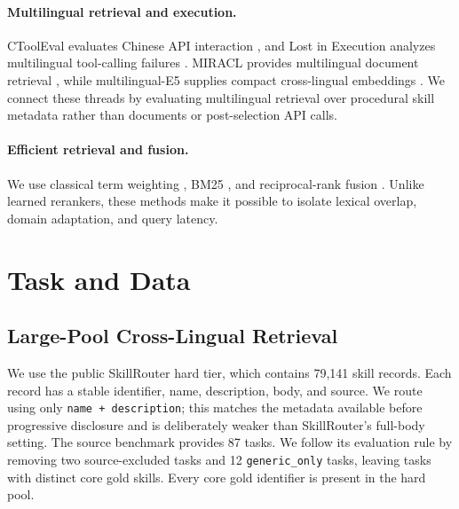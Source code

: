 \documentclass[letterpaper]{article}
\begin{document}
\paragraph{Multilingual retrieval and execution.}
CToolEval evaluates Chinese API interaction \cite{guo2024ctooleval}, and
Lost in Execution analyzes multilingual tool-calling failures
\cite{luo2026lost}.  MIRACL provides multilingual document retrieval
\cite{zhang2023miracl}, while multilingual-E5 supplies compact cross-lingual
embeddings \cite{wang2024multilinguale5}.  We connect these threads by
evaluating multilingual retrieval over procedural skill metadata rather than
documents or post-selection API calls.

\paragraph{Efficient retrieval and fusion.}
We use classical term weighting \cite{salton1988term}, BM25
\cite{robertson2009bm25}, and reciprocal-rank fusion
\cite{cormack2009rrf}.  Unlike learned rerankers, these methods make it
possible to isolate lexical overlap, domain adaptation, and query latency.

\section{Task and Data}

\subsection{Large-Pool Cross-Lingual Retrieval}

We use the public SkillRouter hard tier, which contains 79,141 skill records.
Each record has a stable identifier, name, description, body, and source.  We
route using only \texttt{name + description}; this matches the metadata
available before progressive disclosure and is deliberately weaker than
SkillRouter's full-body setting.  The source benchmark provides 87 tasks.  We
follow its evaluation rule by removing two source-excluded tasks and 12
\texttt{generic\_only} tasks, leaving \PublicTaskCount{} tasks with
\PublicGoldCount{} distinct core gold skills.  Every core gold identifier is
present in the hard pool.
\end{document}
